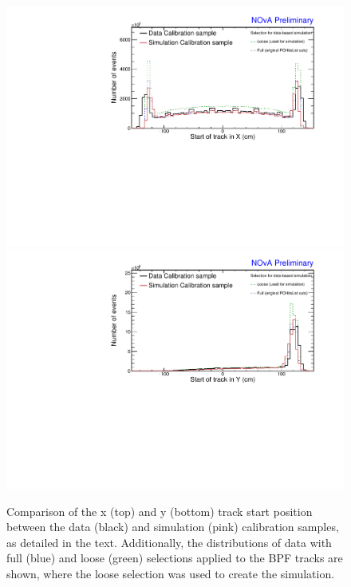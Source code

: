 \begin{figure}[!ht]
\includegraphics[width=\textwidth]{Plots/TBCalibration/DBSim_DataMCComparison_StartX.pdf}
\includegraphics[width=\textwidth]{Plots/TBCalibration/DBSim_DataMCComparison_StartY.pdf}
\caption[Data-Simulation comparison of track start distributions]{Comparison of the x (top) and y (bottom) track start position between the data (black) and simulation (pink) calibration samples, as detailed in the text. Additionally, the distributions of data with full (blue) and loose (green) selections applied to the \acrshort{BPF} tracks are shown, where the loose selection was used to create the simulation.}
\label{fig:DataBasedSimDataMCComparison_startXstartY}
\end{figure}


